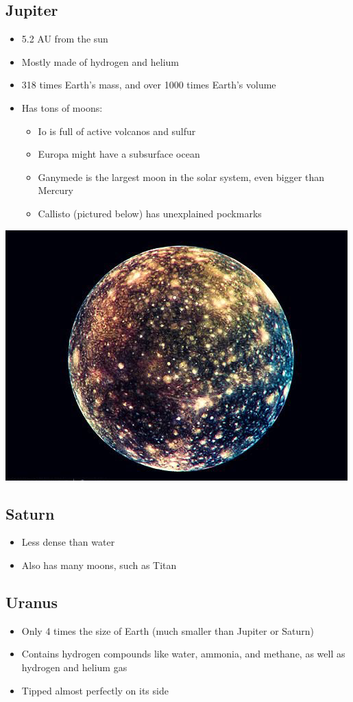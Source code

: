 \documentclass[class=article, crop=false]{standalone}
\begin{document}
\subsection{Jupiter}
\begin{itemize}
    \item 5.2 AU from the sun
    \item Mostly made of hydrogen and helium
    \item 318 times Earth's mass, and over 1000 times Earth's volume
    \item Has tons of moons: \begin{itemize}
        \item Io is full of active volcanos and sulfur
        \item Europa might have a subsurface ocean
        \item Ganymede is the largest moon in the solar system, even bigger than Mercury
        \item Callisto (pictured below) has unexplained pockmarks
    \end{itemize}
\end{itemize}
\begin{center}
    \includegraphics[width=.5\textwidth]{callisto.png}
\end{center}
\subsection{Saturn}
\begin{itemize}
    \item Less dense than water
    \item Also has many moons, such as Titan
\end{itemize}
\subsection{Uranus}
\begin{itemize}
    \item Only 4 times the size of Earth (much smaller than Jupiter or Saturn)
    \item Contains hydrogen compounds like water, ammonia, and methane, as well as hydrogen and helium gas
    \item Tipped almost perfectly on its side
\end{itemize}
\end{document}

